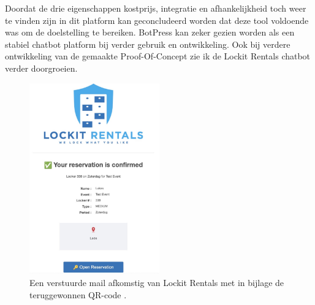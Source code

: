 Doordat de drie eigenschappen kostprijs, integratie en afhankelijkheid toch weer te vinden zijn in dit platform kan geconcludeerd worden dat deze tool voldoende was om de doelstelling te bereiken. BotPress kan zeker gezien worden als een stabiel chatbot platform bij verder gebruik en ontwikkeling. Ook bij verdere ontwikkeling van de gemaakte Proof-Of-Concept zie ik de Lockit Rentals chatbot verder doorgroeien.



\begin{figure}[h]
    \centering
    \includegraphics[width=0.5\textwidth]{graphics/F34_mailQR-code.jpg}
    \captionsetup{justification=centering, singlelinecheck=false}
    
    \caption{Een verstuurde mail afkomstig van Lockit Rentals met in bijlage de teruggewonnen QR-code \autocite{LockitRentals}.}
    \label{fig:resultatEmailQR-code}
\end{figure}












